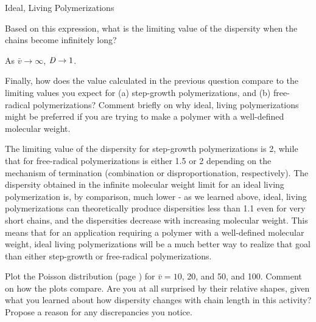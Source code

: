 \begin{activity}{Ideal, Living Polymerizations}
\begin{ctqs}
	\clearpage
	\question Based on this expression, what is the limiting value of the dispersity when the chains become infinitely long?
		
		\begin{solution}[0.5in]
			As $\bar v \to \infty$, $\PDImath \to 1$.
		\end{solution}
	
	\question Finally, how does the value calculated in the previous question compare to the limiting values you expect for (a) step-growth polymerizations, and (b) free-radical polymerizations?  Comment briefly on why ideal, living polymerizations might be preferred if you are trying to make a polymer with a well-defined molecular weight.
		
		\begin{solution}[1.5in]
			The limiting value of the dispersity for step-growth polymerizations is 2, while that for free-radical polymerizations is either 1.5 or 2 depending on the mechanism of termination (combination or disproportionation, respectively).  The dispersity obtained in the infinite molecular weight limit for an ideal living polymerization is, by comparison, much lower - as we learned above, ideal, living polymerizations can theoretically produce dispersities less than 1.1 even for very short chains,  and the dispersities decrease with increasing molecular weight.  This means that for an application requiring a polymer with a well-defined molecular weight, ideal living polymerizations will be a much better way to realize that goal than either step-growth or free-radical polymerizations.
		\end{solution}
	
\end{ctqs}



\begin{exercises}

	\exercise Plot the Poisson distribution (page \pageref{\labelbase:infobox:poisson}) for $\bar v = 10$, 20, and 50, and 100.  Comment on how the plots compare.  Are you at all surprised by their relative shapes, given what you learned about how dispersity changes with chain length in this activity?  Propose a reason for any discrepancies you notice.
	
		\begin{solution}
\end{solution}
\end{exercises}
\end{activity}
